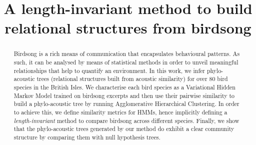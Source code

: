 \documentclass[pdftex,11pt,a4paper]{article}
\theoremstyle{definition}
\theoremstyle{remark}
\begin{document}
\title{A length-invariant method to build relational structures from birdsong}

\maketitle


\begin{abstract}
Birdsong is a rich means of communication that encapsulates behavioural patterns. As such, it can be analysed by means of statistical methods in order to unveil meaningful relationships that help to quantify an environment. In this work, we infer phylo-acoustic trees (relational structures built from acoustic similarity) for over 80 bird species in the British Isles. We characterise each bird species as a Variational Hidden Markov Model trained on birdsong excerpts and then use their pairwise similarity to build a phylo-acoustic tree by running Agglomerative Hierarchical Clustering. In order to achieve this, we define similarity metrics for HMMs, hence implicitly defining a \emph{length-invariant} method to compare birdsong across different species. Finally, we show that the phylo-acoustic trees generated by our method do exhibit a clear community structure by comparing them with null hypothesis trees.
\end{abstract}
\end{document}
